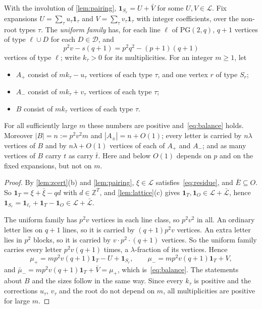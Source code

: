 \documentclass[11pt]{article}
\theoremstyle{definition}
\theoremstyle{plain}
\newcommand{\Z}{\mathbb{Z}}
\newcommand{\PG}{\mathrm{PG}}
\newcommand{\one}{\mathbf{1}}
\begin{document}
\begin{proposition}\label{prop:balance}
With the involution of \cref{lem:pairing}, $\one_{S_r}=U+\bar V$ for some $U,V\in\mathcal L$. Fix expansions $U=\sum_\tau u_\tau\one_\tau$ and $V=\sum_\tau v_\tau\one_\tau$ with integer coefficients, over the non-root types $\tau$. The \emph{uniform family} has, for each line $\ell$ of $\PG(2,q)$, $q+1$ vertices of type $\ell\cup D$ for each $D\in\mathcal D$, and
\[
p^2v-s(q+1)=p^2q^2-(p+1)(q+1)
\]
vertices of type $\ell$; write $k_\tau>0$ for its multiplicities. For an integer $m\ge1$, let
\begin{itemize}[itemsep=0pt]
\item $A_+$ consist of $mk_\tau-u_\tau$ vertices of each type $\tau$, and one vertex $r$ of type $S_r$;
\item $A_-$ consist of $mk_\tau+v_\tau$ vertices of each type $\tau$;
\item $B$ consist of $mk_\tau$ vertices of each type $\tau$.
\end{itemize}
For all sufficiently large $m$ these numbers are positive and~\eqref{eq:balance} holds. Moreover $|B|=n:=p^2v^2m$ and $|A_\pm|=n+O(1)$; every letter is carried by $n\lambda$ vertices of $B$ and by $n\lambda+O(1)$ vertices of each of $A_+$ and $A_-$; and as many vertices of $B$ carry $t$ as carry $\bar t$. Here and below $O(1)$ depends on $p$ and on the fixed expansions, but not on $m$.
\end{proposition}

\begin{proof}
By \cref{lem:zcert}(b) and \cref{lem:pairing}, $\xi\in\mathcal L$ satisfies~\eqref{eq:residue}, and $\bar E\subseteq O$. So $\one_T=\xi+\bar\xi-qd$ with $d\in\Z^T$, and \cref{lem:lattice}(c) gives $\one_T,\one_O\in\mathcal L+\bar{\mathcal L}$, hence $\one_{S_r}=\one_{\ell_r}+\one_T-\one_O\in\mathcal L+\bar{\mathcal L}$.

The uniform family has $p^2v$ vertices in each line class, so $p^2v^2$ in all. An ordinary letter lies on $q+1$ lines, so it is carried by $(q+1)p^2v$ vertices. An extra letter lies in $p^2$ blocks, so it is carried by $v\cdot p^2\cdot(q+1)$ vertices. So the uniform family carries every letter $p^2v(q+1)$ times, a $\lambda$-fraction of its vertices. Hence
\[
\mu_+=mp^2v(q+1)\one_T-U+\one_{S_r},\qquad \mu_-=mp^2v(q+1)\one_T+V,
\]
and $\bar\mu_-=mp^2v(q+1)\one_T+\bar V=\mu_+$, which is~\eqref{eq:balance}. The statements about $B$ and the sizes follow in the same way. Since every $k_\tau$ is positive and the corrections $u_\tau$, $v_\tau$ and the root do not depend on $m$, all multiplicities are positive for large $m$.
\end{proof}
\end{document}
